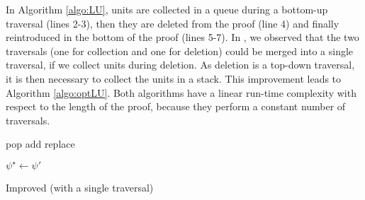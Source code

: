 In Algorithm \ref{algo:LU}, units are collected in a queue
during a bottom-up traversal (lines 2-3), then they are deleted from the proof (line 4) and finally reintroduced in the bottom of the proof (lines 5-7). In \cite{Boudou}, we observed that the two traversals (one for collection and one for deletion) could be merged into a single traversal, if we collect units during deletion. As deletion is a top-down traversal, it is then necessary to collect the units in a stack. This improvement leads to Algorithm \ref{algo:optLU}. Both algorithms have a linear run-time complexity with respect to the length of the proof, because they perform a constant number of traversals.


\begin{algorithm}[pbt]
  \SetAlgoVlined
  \SetAlgoShortEnd

  \BlankLine

   {pop}
   {add}
   {replace}

  \BlankLine

  \BlankLine


  $\psi^{\star} \leftarrow \psi'$ \;

  \caption{Improved {\LowerUnits} (with a single traversal)}
  \label{algo:optLU}
\end{algorithm}


